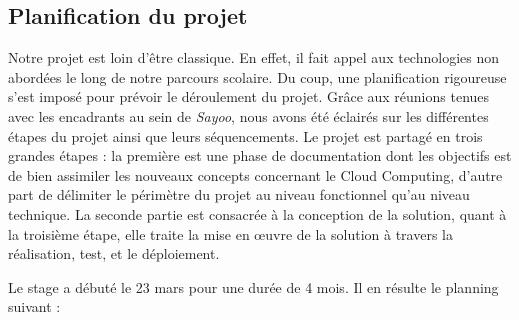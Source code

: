 \begin{onehalfspace}
\section{Planification du projet}

Notre projet est loin d'être classique. En effet, il fait appel aux technologies non abordées le long de notre parcours scolaire. Du coup, une planification rigoureuse s'est imposé pour prévoir le déroulement du projet. Grâce aux réunions tenues avec les encadrants au sein de \emph{Sayoo}, nous avons été éclairés sur les différentes étapes du projet ainsi que leurs séquencements. Le projet est partagé en trois grandes étapes : la première est une phase de documentation dont les objectifs est de bien assimiler les nouveaux concepts concernant le Cloud Computing, d'autre part de délimiter le périmètre du projet au niveau fonctionnel qu'au niveau technique. La seconde partie est consacrée à la conception de la solution, quant à la troisième étape, elle traite la mise en œuvre de la solution à travers la réalisation, test, et le déploiement.

Le stage a débuté le 23 mars pour une durée de 4 mois. Il en résulte le planning suivant :


\end{onehalfspace}
